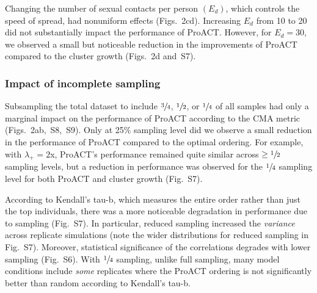 \documentclass[a4paper,11pt]{article}
\newcommand{\PLWH}{sample\xspace}
\begin{document}
Changing the number of sexual contacts per person $\left(E_d\right)$, which controls the speed of spread, had nonuniform effects (Figs.~2cd). 
Increasing $E_d$ from 10 to 20 did not substantially impact the performance of ProACT. However, for $E_d=30$, we observed a small but noticeable reduction in the improvements of ProACT compared to the cluster growth (Figs.~2d and~S7).




\subsubsection{Impact of incomplete sampling}
Subsampling the total dataset to include $\sfrac{3}{4}$, $\sfrac{1}{2}$, or $\sfrac{1}{4}$ of all \PLWH{s} had only a marginal impact on the performance of ProACT according to the CMA metric  (Figs.~2ab,~S8,~S9). 
Only at 25\% sampling level did we observe a small reduction in the performance of ProACT compared to the optimal ordering. 
For example, 
with $\lambda_{+}=2$x, ProACT's performance remained quite similar across $\geq \sfrac{1}{2}$ sampling levels, but a reduction in performance was observed for the $\sfrac{1}{4}$ sampling level for both ProACT and  cluster growth  (Fig.~S7).


According to Kendall's tau-b, which measures the entire order rather than just the top individuals, there was a more noticeable degradation in performance due to sampling (Fig.~S7). 
In particular, reduced sampling increased the \textit{variance} across replicate simulations (note the wider distributions for reduced sampling in Fig.~S7).
Moreover, statistical significance of the correlations degrades with lower sampling (Fig.~S6).
With  $\sfrac{1}{4}$ sampling, unlike full sampling, many model conditions include {\em some} replicates where the ProACT ordering is not significantly better than random according to Kendall's tau-b.
\end{document}
